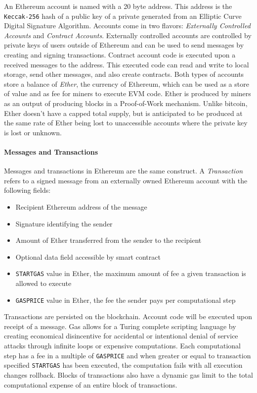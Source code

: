 \documentclass[a4paper,12pt]{article} %
\def\code#1{\texttt{#1}}
\begin{document}
An Ethereum account is named with a 20 byte address. This address is the \code{Keccak-256} hash of a public key of a private generated from an Elliptic Curve Digital Signature Algorithm. Accounts come in two flavors: \textit{Externally Controlled Accounts} and \textit{Contract Accounts}. Externally controlled accounts are controlled by private keys of users outside of Ethereum and can be used to send messages by creating and signing transactions. Contract account code is executed upon a received messages to the address. This executed code can read and write to local storage, send other messages, and also create contracts. Both types of accounts store a balance of \textit{Ether}, the currency of Ethereum, which can be used as a store of value and as fee for miners to execute EVM code. Ether is produced by miners as an output of producing blocks in a Proof-of-Work mechanism. Unlike bitcoin, Ether doesn't have a capped total supply, but is anticipated to be produced at the same rate of Ether being lost to unaccessible accounts where the private key is lost or unknown.

\paragraph*{Messages and Transactions}

Messages and transactions in Ethereum are the same construct. A \textit{Transaction} refers to a signed message from an externally owned Ethereum account with the following fields:

\begin{itemize}
	\item Recipient Ethereum address of the message
	\item Signature identifying the sender
	\item Amount of Ether transferred from the sender to the recipient
	\item Optional data field accessible by smart contract
	\item \code{STARTGAS} value in Ether, the maximum amount of fee a given transaction is allowed to execute
	\item \code{GASPRICE} value in Ether, the fee the sender pays per computational step
\end{itemize}

Transactions are persisted on the blockchain. Account code will be executed upon receipt of a message. Gas allows for a Turing complete scripting language by creating economical disincentive for accidental or intentional denial of service attacks through infinite loops or expensive computations. Each computational step has a fee in a multiple of \code{GASPRICE} and when greater or equal to transaction specified \code{STARTGAS} has been executed, the computation fails with all execution changes rollback. Blocks of transactions also have a dynamic gas limit to the total computational expense of an entire block of transactions.
\end{document}
